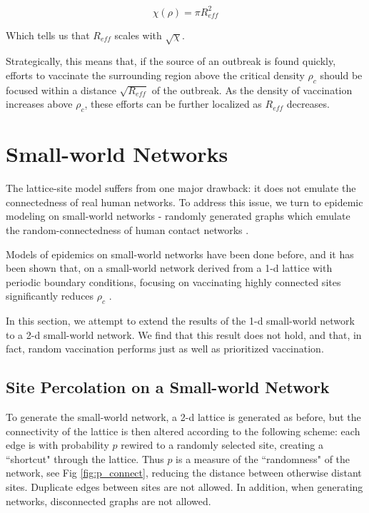 \documentclass{article}
\begin{document}
$$
\chi(\rho) = \pi R_{eff}^2
$$

Which tells us that $R_{eff}$ scales with $\sqrt{\chi}$.

Strategically, this means that, if the source of an outbreak is found quickly, efforts to vaccinate the surrounding region above the critical density $\rho_c$ should be focused within a distance $\sqrt{R_{eff}}$ of the outbreak. As the density of vaccination increases above $\rho_c$, these efforts can be further localized as $R_{eff}$ decreases.


\section{Small-world Networks}
The lattice-site model suffers from one major drawback: it does not emulate the connectedness of real human networks. To address this issue, we turn to epidemic modeling on small-world networks - randomly generated graphs which emulate the random-connectedness of human contact networks \cite{Newman_Watts}.

Models of epidemics on small-world networks have been done before, and it has been shown that, on a small-world network derived from a 1-d lattice with periodic boundary conditions, focusing on vaccinating highly connected sites significantly reduces $\rho_c$ \cite{Zanette}.

In this section, we attempt to extend the results of the 1-d small-world network to a 2-d small-world network. We find that this result does not hold, and that, in fact, random vaccination performs just as well as prioritized vaccination.

\subsection{Site Percolation on a Small-world Network}

To generate the small-world network, a 2-d lattice is generated as before, but the connectivity of the lattice is then altered according to the following scheme: each edge is with probability $p$ rewired to a randomly selected site, creating a ``shortcut" through the lattice. Thus $p$ is a measure of the ``randomness" of the network, see Fig \ref{fig:p_connect}, reducing the distance between otherwise distant sites. Duplicate edges between sites are not allowed. In addition, when generating networks, disconnected graphs are not allowed.
\end{document}
